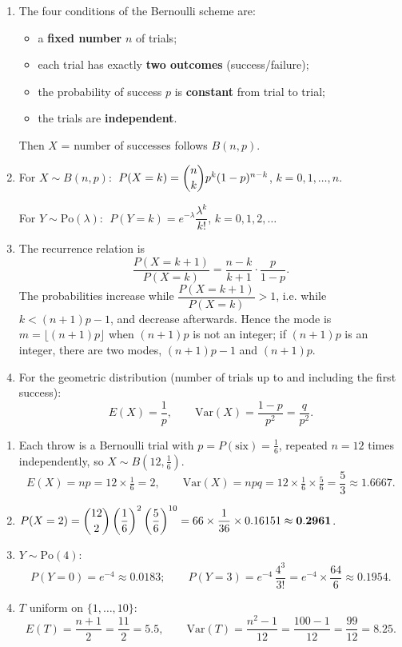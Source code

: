 \documentclass[11pt]{article}
\newcommand{\cle}[1]{{\popxbold\color{popdark}#1}}
\begin{document}
\begin{corrige}
\begin{enumerate}
\item The four conditions of the Bernoulli scheme are:
\begin{itemize}
\item a \textbf{fixed number} $n$ of trials;
\item each trial has exactly \textbf{two outcomes} (success/failure);
\item the probability of success $p$ is \textbf{constant} from trial to trial;
\item the trials are \textbf{independent}.
\end{itemize}
Then $X$ = number of successes follows $B(n, p)$.
\item For $X \sim B(n, p)$: $\;P(X = k) = \dbinom{n}{k} p^k (1-p)^{n-k}$, $k = 0, 1, \dots, n$.\par
For $Y \sim \mathrm{Po}(\lambda)$: $\;P(Y = k) = e^{-\lambda}\dfrac{\lambda^k}{k!}$, $k = 0, 1, 2, \dots$
\item The recurrence relation is
\[ \frac{P(X = k+1)}{P(X = k)} = \frac{n - k}{k + 1}\cdot\frac{p}{1-p}. \]
The probabilities increase while $\dfrac{P(X=k+1)}{P(X=k)} > 1$, i.e. while $k < (n+1)p - 1$, and decrease afterwards. Hence the \cle{mode} is $m = \lfloor (n+1)p \rfloor$ when $(n+1)p$ is not an integer; if $(n+1)p$ is an integer, there are two modes, $(n+1)p - 1$ and $(n+1)p$.
\item For the geometric distribution (number of trials up to and including the first success):
\[ E(X) = \frac{1}{p}, \qquad \mathrm{Var}(X) = \frac{1 - p}{p^2} = \frac{q}{p^2}. \]
\end{enumerate}
\end{corrige}

\begin{corrige}
\begin{enumerate}
\item Each throw is a Bernoulli trial with $p = P(\text{six}) = \frac{1}{6}$, repeated $n = 12$ times independently, so $X \sim B\!\left(12, \tfrac{1}{6}\right)$.
\[ E(X) = np = 12 \times \tfrac{1}{6} = 2, \qquad \mathrm{Var}(X) = npq = 12 \times \tfrac{1}{6} \times \tfrac{5}{6} = \frac{5}{3} \approx 1.6667. \]
\item $P(X = 2) = \dbinom{12}{2}\left(\dfrac{1}{6}\right)^{2}\left(\dfrac{5}{6}\right)^{10} = 66 \times \dfrac{1}{36} \times 0.16151 \approx \mathbf{0.2961}$.
\item $Y \sim \mathrm{Po}(4)$:
\[ P(Y = 0) = e^{-4} \approx \mathbf{0.0183}; \qquad P(Y = 3) = e^{-4}\,\frac{4^3}{3!} = e^{-4}\times\frac{64}{6} \approx \mathbf{0.1954}. \]
\item $T$ uniform on $\{1, \dots, 10\}$:
\[ E(T) = \frac{n+1}{2} = \frac{11}{2} = 5.5, \qquad \mathrm{Var}(T) = \frac{n^2 - 1}{12} = \frac{100 - 1}{12} = \frac{99}{12} = 8.25. \]
\end{enumerate}
\end{corrige}
\end{document}
